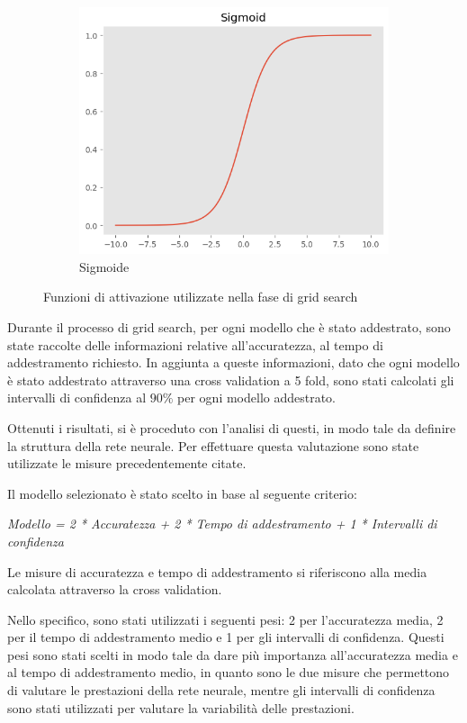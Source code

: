 \begin{figure}[!ht]
    \hfill
    \begin{subfigure}[b]{0.3\textwidth}
        \centering
        \includegraphics[width=\textwidth]{img/rete/sigmoid.png}
        \caption{Sigmoide}
        \label{fig:sigmoid}
    \end{subfigure}
    \caption{Funzioni di attivazione utilizzate nella fase di grid search}
    \label{fig:}
\end{figure}

Durante il processo di grid search, per ogni modello che è stato addestrato, sono
state raccolte delle informazioni relative all'accuratezza, al tempo di addestramento
richiesto. In aggiunta a queste informazioni, dato che ogni modello è stato
addestrato attraverso una cross validation a 5 fold, sono stati calcolati gli
intervalli di confidenza al $90\%$ per ogni modello addestrato.

Ottenuti i risultati, si è proceduto con l'analisi di questi, in modo tale da
definire la struttura della rete neurale. Per effettuare questa valutazione sono
state utilizzate le misure precedentemente citate.

Il modello selezionato è stato scelto in base al seguente criterio:
\begin{center}
    \textit{Modello = 2 * Accuratezza + 2 * Tempo di addestramento + 1 * Intervalli di confidenza}
\end{center}
Le misure di accuratezza e tempo di addestramento si riferiscono alla media
calcolata attraverso la cross validation.

Nello specifico, sono stati utilizzati i seguenti pesi: 2 per l'accuratezza
media, 2 per il tempo di addestramento medio e 1 per gli intervalli di
confidenza. Questi pesi sono stati scelti in modo tale da dare più importanza
all'accuratezza media e al tempo di addestramento medio, in quanto sono le due
misure che permettono di valutare le prestazioni della rete neurale, mentre gli
intervalli di confidenza sono stati utilizzati per valutare la variabilità delle
prestazioni.

